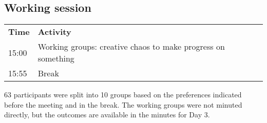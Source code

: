 \subsection{Working session}

\begin{table}[!h]
    \centering
    \begin{tabular}{@{}|p{}|p{}|@{}}
    \rowcolor{Task32Blue2} \textbf{Time} & \textbf{Activity} \\
    15:00 & Working groups: creative chaos to make progress on something \\
    15:55 & Break \\
    \end{tabular}
    \label{tab:day1-workingsession-agenda}
\end{table}

63 participants were split into 10 groups based on the preferences indicated before the meeting and in the break. The working groups were not minuted directly, but the outcomes are available in the minutes for Day 3.
